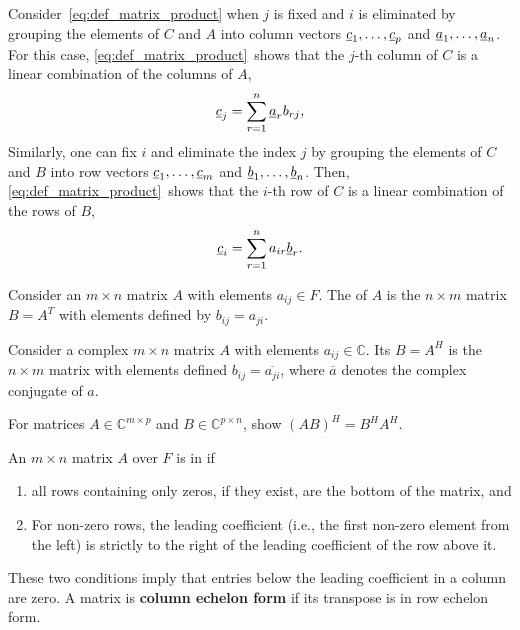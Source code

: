 \begin{remark}
Consider~\eqref{eq:def_matrix_product} when $j$ is fixed and $i$ is eliminated by grouping the elements of $C$ and $A$ into column vectors $\underline{c}_1,\ldots,\underline{c}_{p}$ and $\underline{a}_1,\ldots,\underline{a}_n$. For this case, \eqref{eq:def_matrix_product}~shows that the $j$-th column of $C$ is a linear combination of the columns of $A$,
\[ \underline{c}_{j} = \sum_{r = 1}^n \underline{a}_r b_{rj}, \]
Similarly, one can fix $i$ and eliminate the index $j$ by grouping the elements of $C$ and $B$ into row vectors  $\underline{c}_1,\ldots,\underline{c}_{m}$ and $\underline{b}_1,\ldots,\underline{b}_n$.
Then, \eqref{eq:def_matrix_product}~shows that the $i$-th row of $C$ is a linear combination of the rows of $B$,
\[ \underline{c}_{i} = \sum_{r = 1}^n a_{ir} \underline{b}_r. \]
\end{remark}

\begin{definition}
Consider an $m \times n$ matrix $A$ with elements $a_{ij} \in F$.
The  of $A$ is the $n \times m$ matrix $B = A^T$ with elements defined by $b_{ij} = a_{ji}$.
\end{definition}

\begin{definition}
Consider a complex $m \times n$ matrix $A$ with elements $a_{ij} \in \mathbb{C}$.
Its  $B = A^H$ is the $n \times m$ matrix with elements defined $b_{ij} = \overline{a_{ji}}$, where $\overline{a}$ denotes the complex conjugate of $a$.
\end{definition}

\begin{problem}
For matrices $A \in \mathbb{C}^{m\times p}$ and $B \in \mathbb{C}^{p \times n}$, show $(AB)^H = B^H A^H$.
\end{problem}

\begin{definition}
An $m\times n$ matrix $A$ over $F$ is in  if
\begin{enumerate}
\item all rows containing only zeros, if they exist, are the bottom of the matrix, and
\item For non-zero rows, the leading coefficient (i.e., the first non-zero element from the left) is strictly to the right of the leading coefficient of the row above it.
\end{enumerate}
These two conditions imply that entries below the leading coefficient in a column are zero.
A matrix is \textbf{column echelon form} if its transpose is in row echelon form.
\end{definition}

